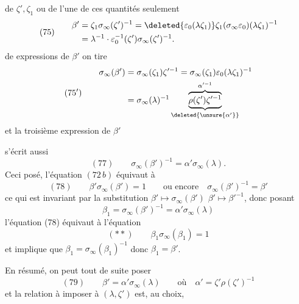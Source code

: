 de $\zeta',\zeta_1$ ou de l'une de ces quantités seulement
\[
(75)\qquad\begin{aligned}
\beta'&=\zeta_1\sigma_\infty(\zeta')^{-1}=\deleted{\varepsilon_0(\lambda\zeta_1)}\zeta_1(\sigma_\infty\varepsilon_0)(\lambda\zeta_1)^{-1}\\
&=\lambda^{-1}\cdot\varepsilon_0^{-1}(\zeta')\sigma_\infty(\zeta')^{-1}.
\end{aligned}
\]
de   expressions de $\beta'$ on tire
\[
(75')\qquad\begin{aligned}
\sigma_\infty(\beta')&=\sigma_\infty(\zeta_1)\zeta'^{-1}=\sigma_\infty(\zeta_1)\varepsilon_0(\lambda\zeta_1)^{-1}\\
&=\sigma_\infty(\lambda)^{-1}\underbrace{\overbrace{\rho(\zeta')\zeta'^{-1}}^{\alpha'^{-1}}}_{\deleted{\unsure{\alpha'}}}
\end{aligned}
\]
et la troisième expression de $\beta'$ 

\deleted{\[(77)\qquad\beta'\sigma_\infty(\beta')=1\]}
s'écrit aussi
\[
(77)\qquad\sigma_\infty(\beta')^{-1}=\alpha'\sigma_\infty(\lambda).
\]
Ceci posé, l'équation $(72\,b)$ équivaut à
\[
(78)\qquad\beta'\sigma_\infty(\beta')=1\qquad\text{ou encore}\quad\sigma_\infty(\beta')^{-1}=\beta'
\]
ce qui est invariant par la substitution $\beta'\mapsto\sigma_\infty(\beta')$  $\beta'\mapsto\beta'^{-1}$, donc posant
\[
\beta_1=\sigma_\infty(\beta')^{-1}=\alpha'\sigma_\infty(\lambda)
\]
l'équation (78) équivaut à l'équation
\[
(**)\qquad\beta_1\sigma_\infty(\beta_1)=1
\]
et implique que $\beta_1=\sigma_\infty(\beta_1)^{-1}$ donc $\beta_1=\beta'$.

En résumé, on peut tout de suite poser
\[
(79)\qquad\beta'=\alpha'\sigma_\infty(\lambda)\qquad\text{où}\quad\alpha'=\zeta'\rho(\zeta')^{-1}
\]
et la relation à imposer à $(\lambda,\zeta')$ est, au choix,
